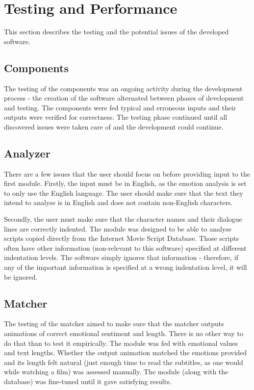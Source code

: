 \chapter{Testing and Performance \label{chap:testingperf}}

This section describes the testing and the potential issues of the developed software.

\section{Components}
The testing of the components was an ongoing activity during the development process - the creation of the software alternated between phases of development and testing. The components were fed typical and erroneous inputs and their outputs were verified for correctness. The testing phase continued until all discovered issues were taken care of and the development could continue.

\section{Analyzer}
There are a few issues that the user should focus on before providing input to the first module. Firstly, the input must be in English, as the emotion analysis is set to only use the English language. The user should make sure that the text they intend to analyse is in English and does not contain non-English characters.

Secondly, the user must make sure that the character names and their dialogue lines are correctly indented. The module was designed to be able to analyse scripts copied directly from the Internet Movie Script Database. Those scripts often have other information (non-relevant to this software) specified at different indentation levels. The software simply ignores that information - therefore, if any of the important information is specified at a wrong indentation level, it will be ignored.

\section{Matcher}
The testing of the matcher aimed to make sure that the matcher outputs animations of correct emotional sentiment and length. There is no other way to do that than to test it empirically. The module was fed with emotional values and text lengths. Whether the output animation matched the emotions provided and its length felt natural (just enough time to read the subtitles, as one would while watching a film) was assessed manually. The module (along with the database) was fine-tuned until it gave satisfying results.

